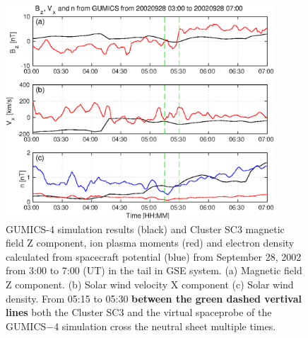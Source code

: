\documentclass[linenumbers,draft]{agujournal}
\begin{document}
\begin{figure}[h]
\centering
\includegraphics[width=0.9\textwidth,angle=0]{swe-2021-corr-f19}  
\caption{GUMICS-4 simulation results (black) and Cluster SC3 magnetic field Z component, ion plasma moments (red) and electron density calculated from spacecraft potential (blue) from September 28, 2002 from 3:00 to 7:00 (UT) in the tail in GSE system. (a) Magnetic field Z component. (b) Solar wind velocity X component (c) Solar wind density. From 05:15 to 05:30  \textbf{between the green dashed vertival lines} both the Cluster SC3 and the virtual spaceprobe of the GUMICS$-$4 simulation cross the neutral sheet multiple times.}
\label{fig:nsplot}
\end{figure}

\pagebreak



\pagebreak
\end{document}
